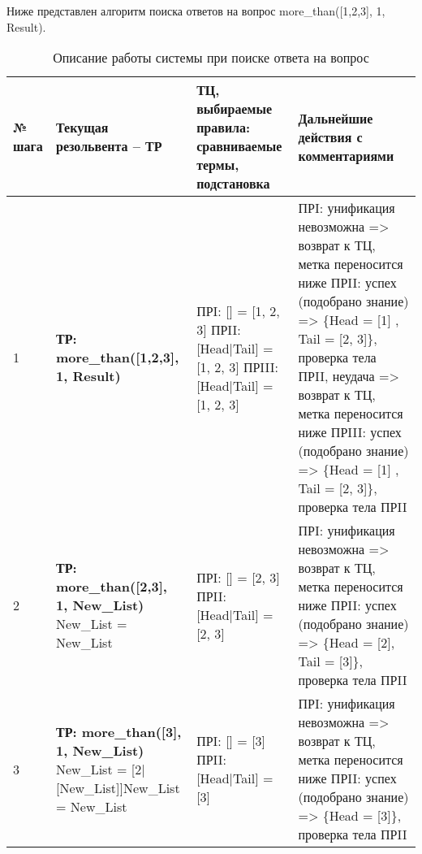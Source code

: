 Ниже представлен алгоритм поиска ответов на вопрос more\_than([1,2,3], 1, Result).\newpage
\begin{table}[h!]
	\caption{Описание работы системы при поиске ответа на вопрос}
	\begin{tabular}{|p{1.2cm}|p{5cm}|p{4cm}|p{6cm}|}
		\hline
		№ шага & Текущая резольвента –  ТР  & ТЦ, выбираемые правила: сравниваемые термы, 
		подстановка
		& Дальнейшие действия с комментариями \\
		\hline
		1 & \textbf{ТР: more\_than([1,2,3], 1, Result)} & ПРI: [] = [1, 2, 3] \newline
		ПРII:	[Head|Tail] = [1, 2, 3] \newline
		ПРIII:	[Head|Tail] = [1, 2, 3] 
		& ПРI: унификация невозможна => возврат к ТЦ, метка переносится ниже \newline ПРII: успех (подобрано знание) => \{Head = [1] , Tail = [2, 3]\},  проверка тела ПРII, неудача => возврат к ТЦ, метка переносится ниже \newline ПРIII: успех (подобрано знание) => \{Head = [1] , Tail = [2, 3]\},  проверка тела ПРII \\
		\hline
		2 & \textbf{ТР: more\_than([2,3], 1, New\_List)} \newline New\_List = New\_List & ПРI: [] = [2, 3] \newline
		ПРII:	[Head|Tail] = [2, 3]   & ПРI: унификация невозможна => возврат к ТЦ, метка переносится ниже \newline ПРII: успех (подобрано знание) => \{Head = [2], Tail = [3]\},  проверка тела ПРII \\
		\hline
		3 & \textbf{ТР: more\_than([3], 1, New\_List)}  \newline New\_List = [2|[New\_List]]\newline New\_List = New\_List & ПРI: [] = [3] \newline
		ПРII:	[Head|Tail] = [3]  & ПРI: унификация невозможна => возврат к ТЦ, метка переносится ниже \newline ПРII: успех (подобрано знание) => \{Head = [3]\},  проверка тела ПРII \\
		\hline
		

\end{tabular}
\end{table}
